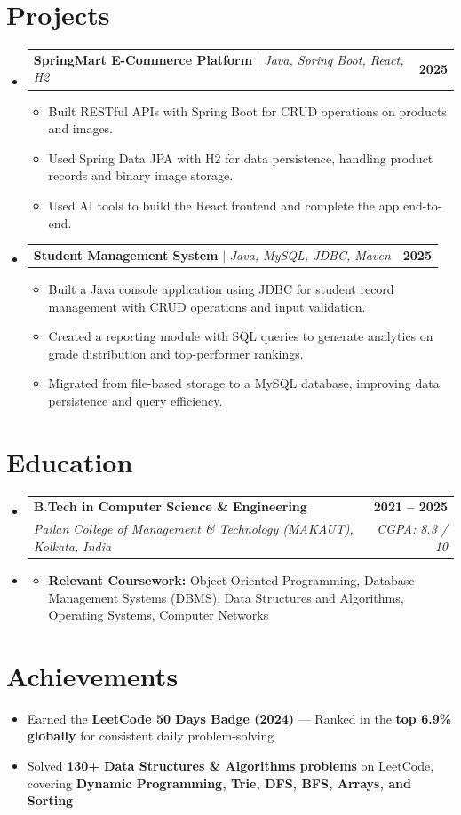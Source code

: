 \documentclass[letterpaper,11pt]{article}
\makeatletter
\newcommand{\resumeItem}[1]{\item\small{{#1 \vspace{-2pt}}}}
\newcommand{\resumeSubheading}[4]{
\vspace{-2pt}\item
    \begin{tabular*}{1.0\textwidth}[t]{l@{\extracolsep{\fill}}r}
        \textbf{#1} & \textbf{\small #2} \\
        \textit{\small#3} & \textit{\small #4} \\
    \end{tabular*}\vspace{-6pt}
}
\newcommand{\resumeProjectHeading}[2]{
    \item
    \begin{tabular*}{1.001\textwidth}{l@{\extracolsep{\fill}}r}
        \small#1 & \textbf{\small #2}\\
    \end{tabular*}\vspace{-6pt}
}
\newcommand{\resumeItemListStart}{\begin{itemize}[leftmargin=0.2in, label=$\bullet$]}
\newcommand{\resumeItemListEnd}{\end{itemize}\vspace{-5pt}}
\newcommand{\resumeSubHeadingListStart}{\begin{itemize}[leftmargin=0.0in, label={}]}
\newcommand{\resumeSubHeadingListEnd}{\end{itemize}}
\makeatother
\begin{document}
\section{Projects}
\resumeSubHeadingListStart
\resumeProjectHeading
    {\textbf{SpringMart E-Commerce Platform} $|$ \emph{Java, Spring Boot, React, H2}}{2025}
    \resumeItemListStart
        \resumeItem{Built RESTful APIs with Spring Boot for CRUD operations on products and images.}
        \resumeItem{\sloppy Used Spring Data JPA with H2 for data persistence, handling product records and binary image storage.}
        \resumeItem{\sloppy Used AI tools to build the React frontend and complete the app end-to-end.}
    \resumeItemListEnd
\resumeProjectHeading
    {\textbf{Student Management System} $|$ \emph{Java, MySQL, JDBC, Maven}}{2025}
    \resumeItemListStart
        \resumeItem{\sloppy Built a Java console application using JDBC for student record management with CRUD operations and input validation.}
        \resumeItem{Created a reporting module with SQL queries to generate analytics on grade distribution and top-performer rankings.}
        \resumeItem{\sloppy Migrated from file-based storage to a MySQL database, improving data persistence and query efficiency.}
    \resumeItemListEnd
\resumeSubHeadingListEnd

\section{Education}
\resumeSubHeadingListStart
\resumeSubheading
    {B.Tech in Computer Science \& Engineering}{2021 – 2025}
    {Pailan College of Management \& Technology (MAKAUT), Kolkata, India}{CGPA: 8.3 / 10}
\item \vspace{2pt}
    \resumeItemListStart
        \resumeItem{{\sloppy\textbf{Relevant Coursework:} Object-Oriented Programming, Database Management Systems (DBMS), Data Structures and Algorithms, Operating Systems, Computer Networks\par}}
    \resumeItemListEnd
\resumeSubHeadingListEnd

\section{Achievements}
\vspace{0pt}
\resumeItemListStart
\resumeItem{Earned the \textbf{LeetCode 50 Days Badge (2024)} --- Ranked in the \textbf{top 6.9\% globally} for consistent daily problem-solving}
\resumeItem{Solved \textbf{130+ Data Structures \& Algorithms problems} on LeetCode, covering \textbf{Dynamic Programming, Trie, DFS, BFS, Arrays, and Sorting}}
\resumeItemListEnd
\end{document}
